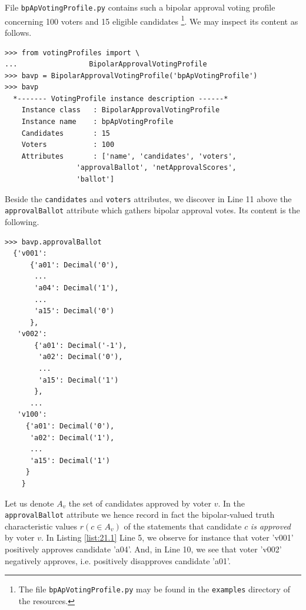File \texttt{bpApVotingProfile.py} contains such a bipolar approval voting profile concerning 100 voters and 15 eligible candidates \footnote{The file \texttt{bpApVotingProfile.py} may be found in the \texttt{examples} directory of the \Digraph resources.}. We may inspect its content as follows.
\begin{lstlisting}
>>> from votingProfiles import \
...                 BipolarApprovalVotingProfile
>>> bavp = BipolarApprovalVotingProfile('bpApVotingProfile')
>>> bavp
  *------- VotingProfile instance description ------*
    Instance class   : BipolarApprovalVotingProfile
    Instance name    : bpApVotingProfile
    Candidates       : 15
    Voters           : 100
    Attributes       : ['name', 'candidates', 'voters',
                 'approvalBallot', 'netApprovalScores',
                 'ballot']
\end{lstlisting}
Beside the \texttt{candidates} and \texttt{voters} attributes, we discover in Line 11 above the \texttt{approvalBallot} attribute which gathers bipolar approval votes. Its content is the following.
\begin{lstlisting}[caption={Inspecting a bipolar approval ballot},label=list:21.1]
>>> bavp.approvalBallot
  {'v001':
      {'a01': Decimal('0'),
       ...
       'a04': Decimal('1'),
       ...
       'a15': Decimal('0')
      },
   'v002':
       {'a01': Decimal('-1'),
        'a02': Decimal('0'),
        ...
        'a15': Decimal('1')
       },
      ...
   'v100':
     {'a01': Decimal('0'),
      'a02': Decimal('1'),
      ...
      'a15': Decimal('1')
     }
    }
\end{lstlisting}	
Let us denote $A_v$ the set of candidates approved by voter $v$. In the \texttt{approvalBallot} attribute we hence record in fact the bipolar-valued truth characteristic values $r(c \in A_v)$ of the statements that candidate $c$ \emph{is approved} by voter $v$. In Listing \ref{list:21.1} Line 5, we observe for instance that voter 'v001' positively approves candidate 'a04'. And, in Line 10, we see that voter 'v002' negatively approves, i.e. positively disapproves candidate 'a01'.


